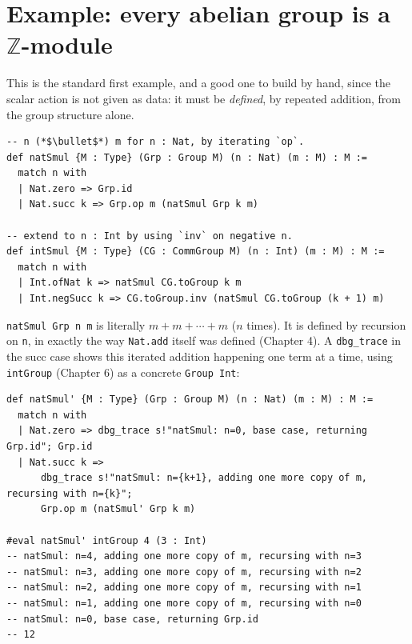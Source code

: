 \section{\texorpdfstring{Example: every abelian group is a \(\mathbb{Z}\)-module}{Example: every abelian group is a \textbackslash mathbb\{Z\}-module}}\label{sec:10-modules:03-z-module-example:1}

This is the standard first example, and a good one to build by hand, since the scalar action is not given as data: it must be \emph{defined}, by repeated addition, from the group structure alone.

\begin{lstlisting}
-- n (*$\bullet$*) m for n : Nat, by iterating `op`.
def natSmul {M : Type} (Grp : Group M) (n : Nat) (m : M) : M :=
  match n with
  | Nat.zero => Grp.id
  | Nat.succ k => Grp.op m (natSmul Grp k m)

-- extend to n : Int by using `inv` on negative n.
def intSmul {M : Type} (CG : CommGroup M) (n : Int) (m : M) : M :=
  match n with
  | Int.ofNat k => natSmul CG.toGroup k m
  | Int.negSucc k => CG.toGroup.inv (natSmul CG.toGroup (k + 1) m)
\end{lstlisting}

\texttt{natSmul Grp n m} is literally \(m + m + \cdots + m\) (\(n\) times). It is defined by recursion on \texttt{n}, in exactly the way \texttt{Nat.add} itself was defined (Chapter 4). A \texttt{dbg\_\allowbreak{}trace} in the succ case shows this iterated addition happening one term at a time, using \texttt{intGroup} (Chapter 6) as a concrete \texttt{Group Int}:

\begin{lstlisting}
def natSmul' {M : Type} (Grp : Group M) (n : Nat) (m : M) : M :=
  match n with
  | Nat.zero => dbg_trace s!"natSmul: n=0, base case, returning Grp.id"; Grp.id
  | Nat.succ k =>
      dbg_trace s!"natSmul: n={k+1}, adding one more copy of m, recursing with n={k}";
      Grp.op m (natSmul' Grp k m)

#eval natSmul' intGroup 4 (3 : Int)
-- natSmul: n=4, adding one more copy of m, recursing with n=3
-- natSmul: n=3, adding one more copy of m, recursing with n=2
-- natSmul: n=2, adding one more copy of m, recursing with n=1
-- natSmul: n=1, adding one more copy of m, recursing with n=0
-- natSmul: n=0, base case, returning Grp.id
-- 12
\end{lstlisting}

